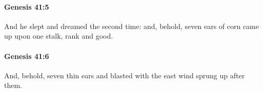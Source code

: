		\paragraph{Genesis 41:5} %
			\label{GENESIS-41-5}

			And he slept and dreamed the second time: and, behold, seven ears of corn came up upon one stalk, rank and good.


		\paragraph{Genesis 41:6} %
			\label{GENESIS-41-6}

			And, behold, seven thin ears and blasted with the east wind sprung up after them.


